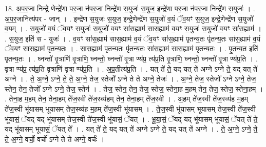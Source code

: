\documentclass[17pt]{extarticle}
\begin{document}
18. अ॒प॒र॒जा निन्द्रे॒ णेन्द्रे॑णा पर॒जा न॑पर॒जा निन्द्रे॑ण स॒युजः॑ स॒युज॒ इन्द्रे॑णा पर॒जा न॑पर॒जा निन्द्रे॑ण स॒युजः॑ । . अ॒प॒र॒जानित्य॑पर - जान् । . इन्द्रे॑ण स॒युजः॑ स॒युज॒ इन्द्रे॒णेन्द्रे॑ण स॒युजो॑ व॒यं ॅव॒यꣳ स॒युज॒ इन्द्रे॒णेन्द्रे॑ण स॒युजो॑ व॒यम् । . स॒युजो॑ व॒यं ॅव॒यꣳ स॒युजः॑ स॒युजो॑ व॒यꣳ सा॑स॒ह्याम॑ सास॒ह्याम॑ व॒यꣳ स॒युजः॑ स॒युजो॑ व॒यꣳ सा॑स॒ह्याम॑ । . स॒युज॒ इति॑ स - युजः॑ । . व॒यꣳ सा॑स॒ह्याम॑ सास॒ह्याम॑ व॒यं ॅव॒यꣳ सा॑स॒ह्याम॑ पृतन्य॒तः पृ॑तन्य॒तः सा॑स॒ह्याम॑ व॒यं ॅव॒यꣳ सा॑स॒ह्याम॑ पृतन्य॒तः । . सा॒स॒ह्याम॑ पृतन्य॒तः पृ॑तन्य॒तः सा॑स॒ह्याम॑ सास॒ह्याम॑ पृतन्य॒तः । . पृ॒त॒न्य॒त इति॑ पृतन्य॒तः । . घ्नन्तो॑ वृ॒त्राणि॑ वृ॒त्राणि॒ घ्नन्तो॒ घ्नन्तो॑ वृ॒त्रा ण्य॑प्र॒ त्य॑प्र॒ति वृ॒त्राणि॒ घ्नन्तो॒ घ्नन्तो॑ वृ॒त्रा ण्य॑प्र॒ति । . वृ॒त्रा ण्य॑प्र॒ त्य॑प्र॒ति वृ॒त्राणि॑ वृ॒त्रा ण्य॑प्र॒ति । . अ॒प्र॒तीत्य॑प्र॒ति । . यत् ते॑ ते॒ यद् यत् ते॑ अग्ने ऽग्ने ते॒ यद् यत् ते॑ अग्ने । . ते॒ अ॒ग्ने॒ ऽग्ने॒ ते॒ ते॒ अ॒ग्ने॒ तेज॒ स्तेजो᳚ ऽग्ने ते ते अग्ने॒ तेजः॑ । . अ॒ग्ने॒ तेज॒ स्तेजो᳚ ऽग्ने ऽग्ने॒ तेज॒ स्तेन॒ तेन॒ तेजो᳚ ऽग्ने ऽग्ने॒ तेज॒ स्तेन॑ । . तेज॒ स्तेन॒ तेन॒ तेज॒ स्तेज॒ स्तेना॒ह म॒हम् तेन॒ तेज॒ स्तेज॒ स्तेना॒हम् । . तेना॒ह म॒हम् तेन॒ तेना॒हम् ते॑ज॒स्वी ते॑ज॒स्व्य॑हम् तेन॒ तेना॒हम् ते॑ज॒स्वी । . अ॒हम् ते॑ज॒स्वी ते॑ज॒स्व्य॑ह म॒हम् ते॑ज॒स्वी भू॑यासम् भूयासम् तेज॒स्व्य॑ह म॒हम् ते॑ज॒स्वी भू॑यासम् । . ते॒ज॒स्वी भू॑यासम् भूयासम् तेज॒स्वी ते॑ज॒स्वी भू॑यासं॒ ॅयद् यद् भू॑यासम् तेज॒स्वी ते॑ज॒स्वी भू॑यासं॒ ॅयत् । . भू॒या॒सं॒ ॅयद् यद् भू॑यासम् भूयासं॒ ॅयत् ते॑ ते॒ यद् भू॑यासम् भूयासं॒ ॅयत् ते᳚ । . यत् ते॑ ते॒ यद् यत् ते॑ अग्ने ऽग्ने ते॒ यद् यत् ते॑ अग्ने । . ते॒ अ॒ग्ने॒ ऽग्ने॒ ते॒ ते॒ अ॒ग्ने॒ वर्चो॒ वर्चो᳚ ऽग्ने ते ते अग्ने॒ वर्चः॑ । \newline
\end{document}
